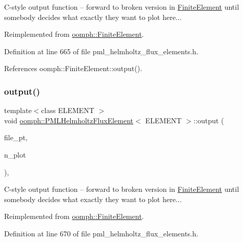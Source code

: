 C-\/style output function -- forward to broken version in \hyperlink{classoomph_1_1FiniteElement}{Finite\+Element} until somebody decides what exactly they want to plot here... 

Reimplemented from \hyperlink{classoomph_1_1FiniteElement_a72cddd09f8ddbee1a20a1ff404c6943e}{oomph\+::\+Finite\+Element}.



Definition at line 665 of file pml\+\_\+helmholtz\+\_\+flux\+\_\+elements.\+h.



References oomph\+::\+Finite\+Element\+::output().

\mbox{\label{classoomph_1_1PMLHelmholtzFluxElement_a30d82efbe15fe325f127ea5028fefc0b}} 
\subsubsection{\texorpdfstring{output()}{output()}\hspace{0.1cm}{\footnotesize\ttfamily [4/4]}}
{\footnotesize\ttfamily template$<$class E\+L\+E\+M\+E\+NT $>$ \\
void \hyperlink{classoomph_1_1PMLHelmholtzFluxElement}{oomph\+::\+P\+M\+L\+Helmholtz\+Flux\+Element}$<$ E\+L\+E\+M\+E\+NT $>$\+::output (\begin{DoxyParamCaption}\item[{F\+I\+LE $\ast$}]{file\+\_\+pt,  }\item[{const unsigned \&}]{n\+\_\+plot }\end{DoxyParamCaption})\hspace{0.3cm}{\ttfamily [inline]}, {\ttfamily [virtual]}}



C-\/style output function -- forward to broken version in \hyperlink{classoomph_1_1FiniteElement}{Finite\+Element} until somebody decides what exactly they want to plot here... 



Reimplemented from \hyperlink{classoomph_1_1FiniteElement_adfaee690bb0608f03320eeb9d110d48c}{oomph\+::\+Finite\+Element}.



Definition at line 670 of file pml\+\_\+helmholtz\+\_\+flux\+\_\+elements.\+h.



